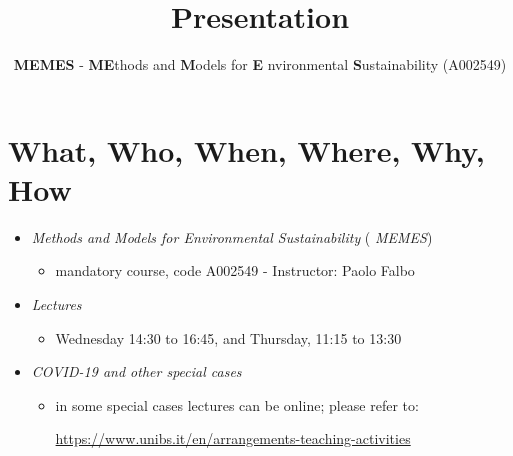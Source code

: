 \documentclass[trans]{beamer}
\newenvironment{stepitemize}{\begin{itemize}[<+->]}{\end{itemize} }
\begin{document}
\title[]{Presentation}
\subtitle{}
\author[]{\textbf{MEMES} - \textbf{ME}thods and \textbf{M}odels for \textbf{E%
}nvironmental \textbf{S}ustainability (A002549)}
\date{}
\maketitle

\section{What, Who, When, Where, Why, How}

\begin{frame}%



%

\begin{stepitemize}
\item \textit{Methods and Models for Environmental Sustainability} (\textit{%
MEMES})

\begin{stepitemize}
\item mandatory course, code A002549 -\TEXTsymbol{>} Instructor: Paolo Falbo
\end{stepitemize}

\item \textit{Lectures}

\begin{stepitemize}
\item Wednesday 14:30 to 16:45, and Thursday, 11:15 to 13:30
\end{stepitemize}

\item \textit{COVID-19 and other special cases}

\begin{stepitemize}
\item in some special cases lectures can be online; please refer to:

\url{https://www.unibs.it/en/arrangements-teaching-activities}%


\end{stepitemize}
\end{stepitemize}
\end{frame}
\end{document}
